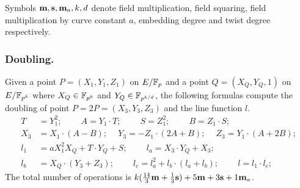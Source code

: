 Symbols $\textbf{m}, \textbf{s}, \textbf{m}_{a}, k, d$ denote
field multiplication,
field squaring,
field multiplication by curve constant $a$,
embedding degree and
twist degree respectively.

\subsubsection{Doubling.}
Given a point $P = (X_1,Y_1,Z_1)$ on $E/\mathbb{F}_{p}$ and a point $Q = (X_Q,Y_Q,1)$ on $E/\mathbb{F}_{p^{k}}$
where $X_Q \in \mathbb{F}_{p^{k}}$ and $Y_Q \in \mathbb{F}_{p^{k/d}}$,
the following formulas compute the doubling of point $P = 2P = (X_3,Y_3,Z_3)$ and the line function $l$.
\begin{align*}
T &= Y_1^2;\	\qquad	A = Y_1 \cdot T;\	\qquad
S = Z_1 ^ 2;\	\qquad	B = Z_1 \cdot S;\\
X_3 &= X_1 \cdot (A - B);\	\quad
Y_3 = -Z_1 \cdot (2A + B);\	\quad
Z_3 = Y_1 \cdot (A + 2B);\\
l_1 &= a X_1^2 X_Q + T \cdot Y_Q + S;\	\qquad
l_a = X_3 \cdot Y_Q + X_3;	\\
l_b &= X_Q \cdot (Y_3 + Z_3);\			\qquad
l_c = l_a^2 + l_b \cdot (l_a + l_b);\		\qquad
l = l_1 \cdot l_c;
\end{align*}
The total number of operations is
$ k(\frac{14}{3}\textbf{m} + \frac{1}{3}\textbf{s}) + 5\textbf{m} +3\textbf{s} + 1\textbf{m}_a$.


